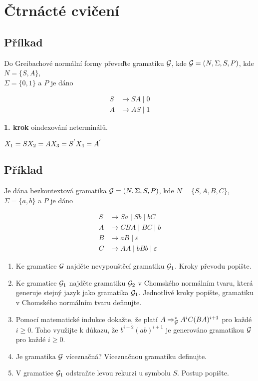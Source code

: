 \section{Čtrnácté cvičení}

\subsection{Přílkad}
Do Greibachové normální formy převeďte gramatiku $\mathcal{G}$, kde $\mathcal{G} = (N, \Sigma, S, P)$, kde $N = \{S, A\}$, 
\\$\Sigma = \{0, 1\}$ a $P$ je dáno

\begin{align*}
    S &\rightarrow SA \mid 0 \\
    A &\rightarrow AS \mid 1
\end{align*}


\textbf{1. krok} oindexování neterminálů.

$X_1 = S \\
X_2 = A \\
X_3 = S^{'} \\
X_4 = A^{'}
$

\subsection{Příklad}
Je dána bezkontextová gramatika $\mathcal{G} = (N, \Sigma, S, P)$, kde $N = \{S,A,B,C\}$, $\Sigma = \{a,b\}$ a $P$ je dáno

\begin{align*}
    S &\rightarrow Sa \mid Sb \mid bC \\
    A &\rightarrow CBA \mid BC \mid b \\
    B &\rightarrow aB \mid \varepsilon \\
    C &\rightarrow AA \mid bBb \mid \varepsilon
\end{align*}

\begin{enumerate}[noitemsep]
    \item Ke gramatice $\mathcal{G}$ najděte nevypouštěcí gramatiku $\mathcal{G}_1$. Kroky převodu popište.
    \item Ke gramatice $\mathcal{G}_1$ najděte gramatiku $\mathcal{G}_2$ v Chomského normálním tvaru, která generuje stejný jazyk jako 
    gramatika $\mathcal{G}_1$. Jednotlivé kroky popište, gramatiku v Chomského normálním tvaru definujte.
    \item Pomocí matematické indukce dokažte, že platí $A \Rightarrow_{\mathcal{G}}^\star A^i C (BA)^{i+1}$ pro každé $i \geq 0$.
    Toho využijte k důkazu, že $b^{i+2}(ab)^{i+1}$ je generováno gramatikou $\mathcal{G}$ pro každé $i \geq 0$.
    \item Je gramatika $\mathcal{G}$ víceznačná? Víceznačnou gramatiku definujte.
    \item V gramatice $\mathcal{G}_1$ odstraňte levou rekurzi u symbolu $S$. Postup popište.
\end{enumerate}

